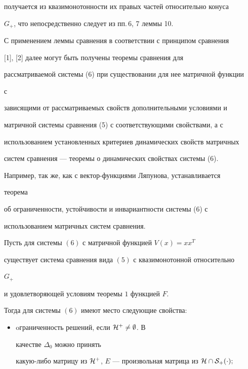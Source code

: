 {получается из квазимонотонности их правых частей относительно конуса 


$G_+$, что непосредственно следует из пп.\,6, 7 леммы 10. 


 


С применением леммы сравнения в соответствии с принципом сравнения


[1], [2] далее могут быть получены теоремы сравнения для 


рассматриваемой системы (6) при существовании для нее матричной функции 


с 


зависящими от рассматриваемых свойств дополнительными условиями и 


матричной системы сравнения (5) с соответствующими свойствами, а с 


использованием установленных критериев динамических свойств матричных 


систем сравнения --- теоремы о динамических свойствах системы (6). 


Например, так же, как с вектор-функциями Ляпунова, устанавливается 


теорема 


об ограниченности, устойчивости и инвариантности системы (6) с 


использованием матричных систем сравнения. 


 


\begin{thm} 


Пусть для системы $(6)$ с матричной функцией $V(x)=x x^T$ 


существует система сравнения вида $(5)$ с квазимонотонной относительно 


$G_+$ 


и удовлетворяющей условиям теоремы $1$ функцией $F$. 


Тогда для системы $(6)$ имеют место следующие свойства$:$


\begin{itemize} 


\item[а)] oграниченность решений, если $\cal H^+\ne\emptyset$. В 


качестве $\Delta_0$ можно принять 


какую-либо матрицу из $\cal H^+$, $E$ --- произвольная матрица из $\cal 


H\cap S_+(\Delta);$ 



\end{itemize}
\end{thm}}
